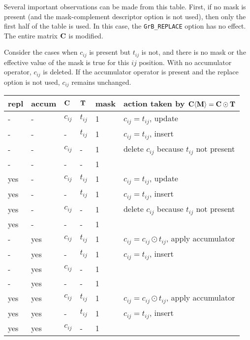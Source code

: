 \documentclass[12pt]{article}
\begin{document}
Several important observations can be made from this table.  First,
if no mask is present (and the mask-complement descriptor option is not used),
then only the first half of the table is used.  In this case, the \verb'GrB_REPLACE'
option has no effect.  The entire matrix ${\bf C}$ is modified.

Consider the cases when $c_{ij}$ is present but $t_{ij}$ is not, and there is no
mask or the effective value of the mask is true for this ${ij}$ position.  With
no accumulator operator, $c_{ij}$ is deleted.  If the accumulator operator is
present and the replace option is not used, $c_{ij}$ remains unchanged.

\begin{table}
{\small
\begin{tabular}{lllll|l}
\hline
repl & accum & ${\bf C}$ & ${\bf T}$ & mask & action taken by ${\bf C \langle M \rangle = C \odot T}$ \\
\hline
    -  &-   & $c_{ij}$ & $t_{ij}$  & 1    &  $c_{ij} = t_{ij}$, update \\
    -  &-   &  -       & $t_{ij}$  & 1    &  $c_{ij} = t_{ij}$, insert \\
    -  &-   & $c_{ij}$ &  -        & 1    &  delete $c_{ij}$ because $t_{ij}$ not present \\
    -  &-   &  -       &  -        & 1    &   \\
\hline
    yes&-   & $c_{ij}$ & $t_{ij}$  & 1    &  $c_{ij} = t_{ij}$, update \\
    yes&-   &  -       & $t_{ij}$  & 1    &  $c_{ij} = t_{ij}$, insert \\
    yes&-   & $c_{ij}$ &  -        & 1    &  delete $c_{ij}$ because $t_{ij}$ not present \\
    yes&-   &  -       &  -        & 1    &   \\
\hline
    -  &yes & $c_{ij}$ & $t_{ij}$  & 1    &  $c_{ij} = c_{ij} \odot t_{ij}$, apply accumulator \\
    -  &yes &  -       & $t_{ij}$  & 1    &  $c_{ij} = t_{ij}$, insert \\
    -  &yes & $c_{ij}$ &  -        & 1    &   \\
    -  &yes &  -       &  -        & 1    &   \\
\hline
    yes&yes & $c_{ij}$ & $t_{ij}$  & 1    &  $c_{ij} = c_{ij} \odot t_{ij}$, apply accumulator \\
    yes&yes &  -       & $t_{ij}$  & 1    &  $c_{ij} = t_{ij}$, insert \\
    yes&yes & $c_{ij}$ &  -        & 1    &   \\

\end{tabular}}
\end{table}
\end{document}
